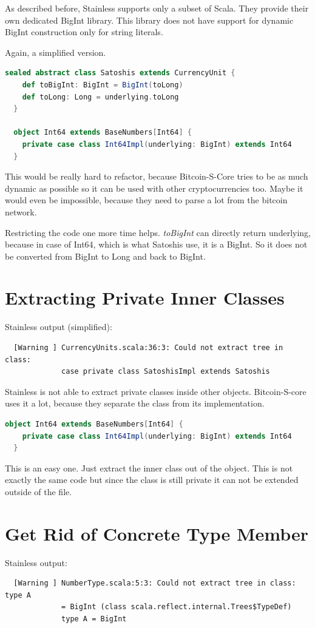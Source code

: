 As described before, Stainless supports only a subset of Scala.
They provide their own dedicated BigInt library.
This library does not have support for dynamic BigInt construction only for string literals.

Again, a simplified version.
\begin{lstlisting}[language=scala]
  sealed abstract class Satoshis extends CurrencyUnit {
    def toBigInt: BigInt = BigInt(toLong)
    def toLong: Long = underlying.toLong
  }

  object Int64 extends BaseNumbers[Int64] {
    private case class Int64Impl(underlying: BigInt) extends Int64
  }
\end{lstlisting}

This would be really hard to refactor, because Bitcoin-S-Core tries to be as much dynamic as possible so it can be used with other cryptocurrencies too.
Maybe it would even be impossible, because they need to parse a lot from the bitcoin network.

Restricting the code one more time helps.
\emph{toBigInt} can directly return underlying, because in case of Int64, which is what Satoshis use, it is a BigInt.
So it does not be converted from BigInt to Long and back to BigInt.


\section{Extracting Private Inner Classes}
Stainless output (simplified):
{\footnotesize\begin{verbatim}
  [Warning ] CurrencyUnits.scala:36:3: Could not extract tree in class:
             case private class SatoshisImpl extends Satoshis
\end{verbatim}}

Stainless is not able to extract private classes inside other objects.
Bitcoin-S-core uses it a lot, because they separate the class from its implementation.
\begin{lstlisting}[language=scala]
  object Int64 extends BaseNumbers[Int64] {
    private case class Int64Impl(underlying: BigInt) extends Int64 
  }
\end{lstlisting}

This is an easy one.
Just extract the inner class out of the object.
This is not exactly the same code but since the class is still private it can not be extended outside of the file.


\section{Get Rid of Concrete Type Member}
Stainless output:
{\footnotesize\begin{verbatim}
  [Warning ] NumberType.scala:5:3: Could not extract tree in class: type A
             = BigInt (class scala.reflect.internal.Trees$TypeDef)
             type A = BigInt
\end{verbatim}}


